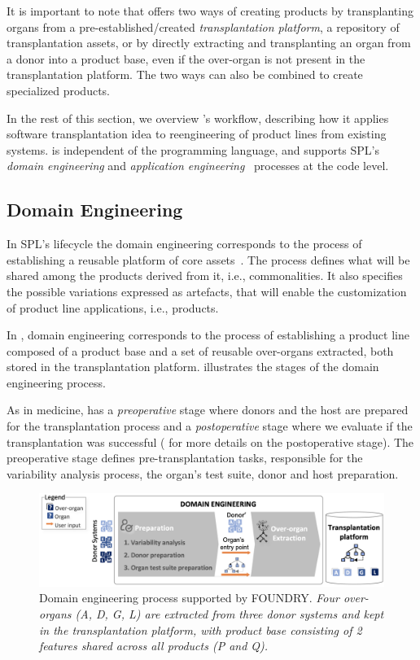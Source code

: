 It is important to note that \FOUNDRY offers two ways of creating products by transplanting organs from a pre-established/created \emph{transplantation platform}, a repository of transplantation assets, or by directly extracting and transplanting an organ from a donor into a product base, even if the over-organ is not present in the transplantation platform. The two ways can also be combined to create specialized products.

In the rest of this section, we overview \FOUNDRY's workflow, describing how it applies software transplantation idea to reengineering of product lines from existing systems. \FOUNDRY is independent of the programming language, and supports SPL's \emph{domain engineering} and \emph{application engineering}~\cite{Clements2001} processes at the code level.

\subsection{Domain Engineering}

In SPL's lifecycle the domain engineering corresponds to the process of establishing a reusable platform of core assets~\cite{Clements2001}. The process defines what will be shared among the products derived from it, i.e., commonalities. It also specifies the possible variations expressed as artefacts, that will enable the customization of product line applications, i.e., products.

In \FOUNDRY, domain engineering corresponds to the process of establishing a product line composed of a product base and a set of reusable over-organs extracted, both stored in the transplantation platform.  illustrates the stages of the domain engineering process. 

As in medicine, \FOUNDRY has a \emph{preoperative} stage where donors and the host are prepared for the transplantation process and a \emph{postoperative} stage where we evaluate if the transplantation was successful ( for more details on the postoperative stage). The preoperative stage defines pre-transplantation tasks, responsible for the variability analysis process, the organ's test suite, donor and host preparation.

\begin{figure}[t]
	\centering  \includegraphics[width=\linewidth]{images/FOUNDRY_DOM6.png}
	\centering \caption{Domain engineering process supported by FOUNDRY. \textit{Four over-organs (A, D, G, L) are extracted from three donor systems and kept in the transplantation platform, with product base consisting of 2 features shared across all products (P and Q).} }
	\label{fig:foundry_dom}
\end{figure} 

